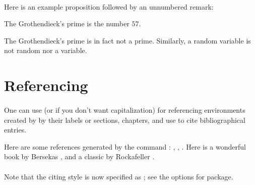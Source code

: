 \paragraph{}Here is an example proposition followed by an unnumbered remark:

\begin{defn}\label{defn:groth-prime}
	The Grothendieck's prime is the number $57$.
\end{defn}

\begin{rmrk*}
	The Grothendieck's prime is in fact not a prime. Similarly, a random variable is not random nor a variable.
\end{rmrk*}

\section{Referencing}
\label{sect:referencing}

\paragraph{}One can use  (or  if you don't want capitalization) for referencing environments created by  by their labels or sections, chapters, and use  to cite bibliographical entries.

\begin{exmp*}
	Here are some references generated by the command : , , . Here is a wonderful book by Bersekas \cite{bertsekas2009convex}, and a classic by Rockafeller \cite{rockafellar+1970}.
\end{exmp*}

\paragraph{}Note that the citing style is now specified as ; see the options for  package.


